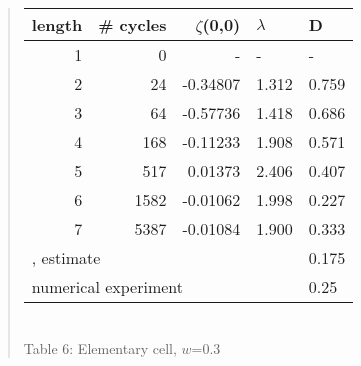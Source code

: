 \documentclass[pre,preprint,groupedaddress,showpacs,showkeys]{revtex4}
\begin{document}
\begin{description}
\begin{quote} \begin{center}
\begin{tabular}{|r|r|r|l|l|}
\hline
length & \# cycles & $\zeta$(0,0) & $\lambda$ & D \\ \hline\hline
1      & 0      &   -    &   -  &   - \\
2      & 24     & -0.34807 & 1.312 & 0.759\\
3      & 64     & -0.57736 & 1.418 & 0.686\\
4      & 168    & -0.11233 & 1.908 & 0.571\\
5      & 517    &  0.01373 & 2.406 & 0.407\\
6      & 1582   & -0.01062 & 1.998 & 0.227\\
7      & 5387   & -0.01084 & 1.900 & 0.333\\ \hline\hline
\multicolumn{4}{|l|}{{MacZwa83}, estimate} & 0.175 \\
\multicolumn{4}{|l|}{numerical experiment} & 0.25 \\ \hline
\end{tabular}\\[10pt]
{Table 6: Elementary cell, $w$=0.3}
\end{center}\end{quote}
\end{description}
\end{document}
